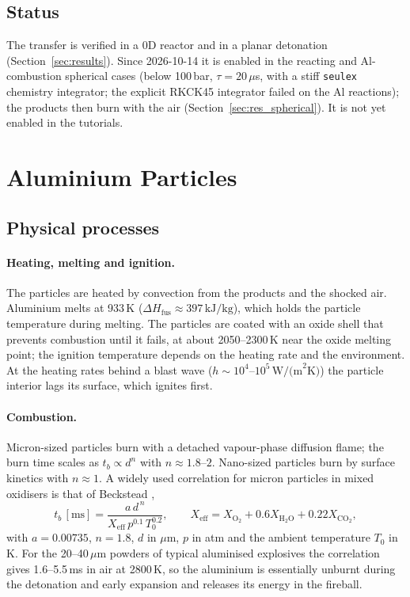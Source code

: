 \documentclass{article}
\begin{document}
\subsection{Status}

The transfer is verified in a 0D reactor and in a planar detonation (Section~\ref{sec:results}). Since 2026-10-14 it is enabled in the reacting and Al-combustion spherical cases (below 100\,bar, $\tau = 20\,\mu$s, with a stiff \texttt{seulex} chemistry integrator; the explicit RKCK45 integrator failed on the Al reactions); the products then burn with the air (Section~\ref{sec:res_spherical}). It is not yet enabled in the tutorials.

\section{Aluminium Particles}
\label{sec:aluminium}

\subsection{Physical processes}

\paragraph{Heating, melting and ignition.} The particles are heated by convection from the products and the shocked air. Aluminium melts at 933\,K ($\Delta H_\text{fus} \approx 397\,\text{kJ/kg}$), which holds the particle temperature during melting. The particles are coated with an oxide shell that prevents combustion until it fails, at about 2050--2300\,K near the oxide melting point; the ignition temperature depends on the heating rate and the environment. At the heating rates behind a blast wave ($h \sim 10^4$--$10^5\,\text{W/(m}^2\text{K)}$) the particle interior lags its surface, which ignites first.

\paragraph{Combustion.} Micron-sized particles burn with a detached vapour-phase diffusion flame; the burn time scales as $t_b \propto d^n$ with $n \approx 1.8$--$2$. Nano-sized particles burn by surface kinetics with $n \approx 1$. A widely used correlation for micron particles in mixed oxidisers is that of Beckstead \cite{beckstead},
\begin{equation}
    t_b\,[\text{ms}] = \frac{a\,d^{\,n}}{X_\text{eff}\,p^{0.1}\,T_0^{0.2}}, \qquad X_\text{eff} = X_{\text{O}_2} + 0.6X_{\text{H}_2\text{O}} + 0.22X_{\text{CO}_2},
    \label{eq:beckstead}
\end{equation}
with $a = 0.00735$, $n = 1.8$, $d$ in $\mu$m, $p$ in atm and the ambient temperature $T_0$ in K.
For the 20--40\,$\mu$m powders of typical aluminised explosives the correlation gives 1.6--5.5\,ms in air at 2800\,K, so the aluminium is essentially unburnt during the detonation and early expansion and releases its energy in the fireball.
\end{document}
